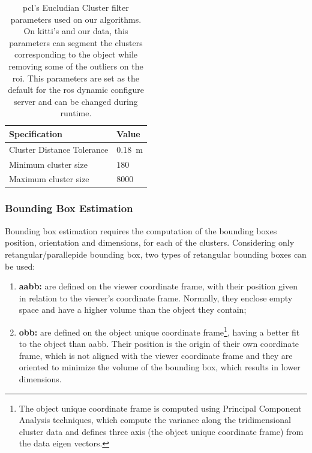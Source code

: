 \begin{table}[H]
	\centering
	\renewcommand{\arraystretch}{1.2}
	\begin{tabular}{@{}p{6cm}l@{}}
	 \toprule
	 Specification & Value \\
	 \midrule
	 Cluster Distance Tolerance & \SI{0.18}{\meter}\footnotemark \\
	 Minimum cluster size & $180$ \\
	 Maximum cluster size & $8000$ \\
	 \bottomrule
	\end{tabular}
	\caption{\ac{pcl}'s Eucludian Cluster filter parameters used on our algorithms. On \ac{kitti}'s and our data, this parameters can segment the clusters corresponding to the object while removing some of the outliers on the \ac{roi}. This parameters are set as the default for the \ac{ros} dynamic configure server and can be changed during runtime.}
	\label{tab:euclidian-cluster-specs}
\end{table}


\subsubsection{Bounding Box Estimation}
\label{subsubsec:object-detection:bounding-box-estimation}
Bounding box estimation requires the computation of the bounding boxes position, orientation and dimensions, for each of the clusters. Considering only retangular/parallepide bounding box, two types of retangular bounding boxes can be used:

\begin{enumerate}
	\item \textbf{\ac{aabb}:} are defined on the viewer coordinate frame, with their position given in relation to the viewer's coordinate frame. Normally, they enclose empty space and have a  higher volume than the object they contain;
	\item \textbf{\ac{obb}:} are defined on the object unique coordinate frame\footnote{The object unique coordinate frame is computed using Principal Component Analysis techniques, which compute the variance along the tridimensional cluster data and defines three axis (the object unique coordinate frame) from the data eigen vectors.}, having a better fit to the object than \ac{aabb}. Their position is the origin of their own coordinate frame, which is not aligned with the viewer coordinate frame and they are oriented to minimize the volume of the bounding box, which results in lower dimensions.
\end{enumerate}

